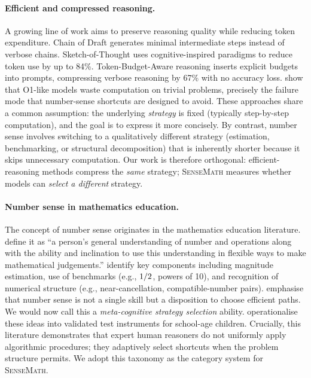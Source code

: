 \paragraph{Efficient and compressed reasoning.}
A growing line of work aims to preserve reasoning quality while reducing token expenditure.
Chain of Draft \citep{kim2024chain} generates minimal intermediate steps instead of verbose chains.
Sketch-of-Thought \citep{aytes2025sketch} uses cognitive-inspired paradigms to reduce token use by up to 84\%.
Token-Budget-Aware reasoning \citep{han2024tokenbudget} inserts explicit budgets into prompts, compressing verbose reasoning by 67\% with no accuracy loss.
\citet{chen2024overthinking} show that O1-like models waste computation on trivial problems, precisely the failure mode that number-sense shortcuts are designed to avoid.
These approaches share a common assumption: the underlying \emph{strategy} is fixed (typically step-by-step computation), and the goal is to express it more concisely.
By contrast, number sense involves switching to a qualitatively different strategy (estimation, benchmarking, or structural decomposition) that is inherently shorter because it skips unnecessary computation.
Our work is therefore orthogonal: efficient-reasoning methods compress the \emph{same} strategy; \textsc{SenseMath} measures whether models can \emph{select a different} strategy.

\paragraph{Number sense in mathematics education.}
The concept of number sense originates in the mathematics education literature.
\citet{mcintosh1992proposed} define it as ``a person's general understanding of number and operations along with the ability and inclination to use this understanding in flexible ways to make mathematical judgements.''
\citet{reys1991number} identify key components including magnitude estimation, use of benchmarks (e.g., $\nicefrac{1}{2}$, powers of 10), and recognition of numerical structure (e.g., near-cancellation, compatible-number pairs).
\citet{sowder1992making} emphasise that number sense is not a single skill but a disposition to choose efficient paths. We would now call this a \emph{meta-cognitive strategy selection} ability.
\citet{yang2003assessing} operationalise these ideas into validated test instruments for school-age children.
Crucially, this literature demonstrates that expert human reasoners do not uniformly apply algorithmic procedures; they adaptively select shortcuts when the problem structure permits.
We adopt this taxonomy as the category system for \textsc{SenseMath}.

